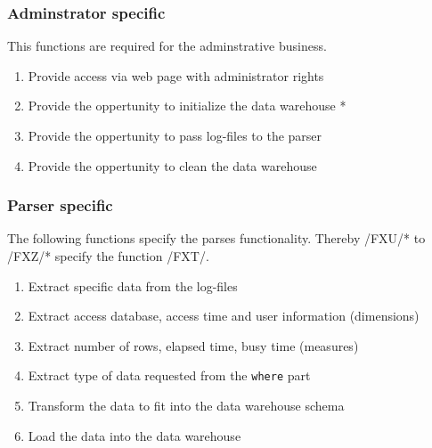 \subsubsection*{Adminstrator specific} 
This functions are required for the adminstrative business.

\begin{enumerate}[resume]
  
  \item Provide access via web page with administrator rights
   
  \item Provide the oppertunity to initialize the data warehouse * %
   
  \item Provide the oppertunity to pass log-files to the parser
  
  \item Provide the oppertunity to clean the data warehouse
   
\end{enumerate}


\subsubsection*{Parser specific} 
 
 The following functions specify the parses functionality. Thereby /FXU/* to /FXZ/* specify
 the function /FXT/.
 
\begin{enumerate}[resume]
  
  \item Extract specific data from the log-files
  
  \item Extract access database, access time and user information (dimensions) %
  
  \item Extract number of rows, elapsed time, busy time (measures) %
  
  \item Extract type of data requested from the \texttt{where} part %
  
  \item Transform the data to fit into the data warehouse schema
  
  \item Load the data into the data warehouse

\end{enumerate}

